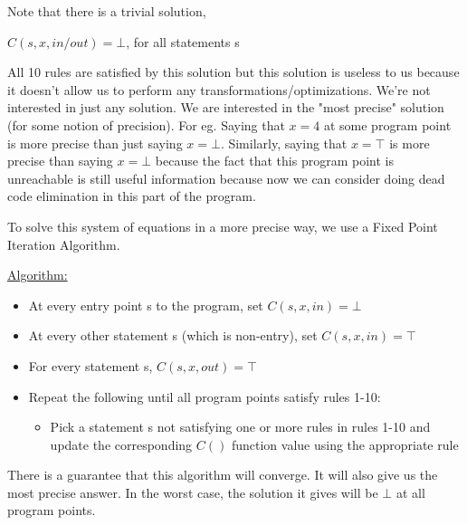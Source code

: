 Note that there is a trivial solution,

\begin{center}
    $C(s, x, in/out) = \bot$, for all statements s
\end{center}

All 10 rules are satisfied by this solution but this solution is useless to us because it doesn't allow us to perform any transformations/optimizations. We're not interested in just any solution. We are interested in the "most precise" solution (for some notion of precision). For eg. Saying that $x=4$ at some program point is more precise than just saying $x=\bot$. Similarly, saying that $x=\top$ is more precise than saying $x=\bot$ because the fact that this program point is unreachable is still useful information because now we can consider doing dead code elimination in this part of the program.

\vspace{0.3cm}

To solve this system of equations in a more precise way, we use a Fixed Point Iteration Algorithm.

\vspace{0.3cm}

\underline{Algorithm:}

\vspace{0.3cm}

\begin{itemize}
    \item At every entry point s to the program, set $C(s, x, in) = \bot$
    \item At every other statement s (which is non-entry), set $C(s,x,in) = \top$
    \item For every statement s, $C(s,x,out) = \top$
    \item Repeat the following until all program points satisfy rules 1-10:
    \begin{itemize}
        \item Pick a statement s not satisfying one or more rules in rules 1-10 and update the corresponding $C()$ function value using the appropriate rule
    \end{itemize}
\end{itemize}

There is a guarantee that this algorithm will converge. It will also give us the most precise answer. In the worst case, the solution it gives will be $\bot$ at all program points.

